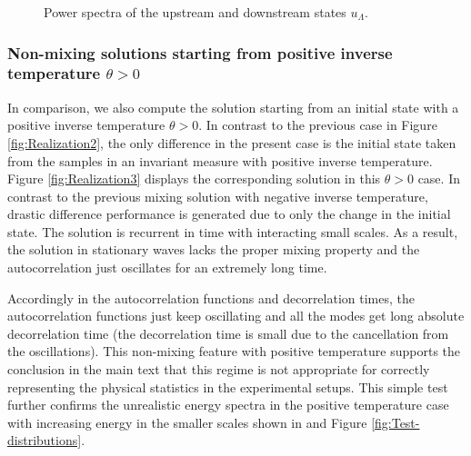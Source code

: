 \documentclass[9pt,twoside,lineno]{pnas-new}
\theoremstyle{plain}
\theoremstyle{plain}
\begin{document}
\begin{figure}[h]
\begin{centering}
_down}
\par\end{centering}
\caption{Power spectra of the upstream and downstream states $u_{\Lambda}$.\label{fig:Power-spectra}}

\end{figure}

\subsubsection*{Non-mixing solutions starting from positive inverse temperature $\theta>0$}

In comparison, we also compute the solution starting from an initial
state with a positive inverse temperature $\theta>0$. In contrast to
the previous case in Figure \ref{fig:Realization2}, the only difference
in the present case is the initial state taken from the samples in
an invariant measure with positive inverse temperature. Figure \ref{fig:Realization3}
displays the corresponding solution in this 
$\theta>0$ case. In contrast to the previous mixing solution with
negative inverse temperature, drastic difference performance is generated
due to only the change in the initial state. The solution is recurrent in time with interacting small scales. As a result, the solution
in stationary waves lacks the proper mixing property and the autocorrelation just
oscillates for an extremely long time.

Accordingly in the autocorrelation functions and decorrelation times,
the autocorrelation functions just keep oscillating and all the modes
get long absolute decorrelation time (the decorrelation time is small
due to the cancellation from the oscillations). This non-mixing feature
with positive temperature supports the conclusion in the main text
that this regime is not appropriate for correctly representing the
physical statistics in the experimental setups. This simple test further
confirms the unrealistic energy spectra in the positive temperature
case with increasing energy in the smaller scales shown in \cite{bajars2013weakly}
and Figure \ref{fig:Test-distributions}.
\end{document}
